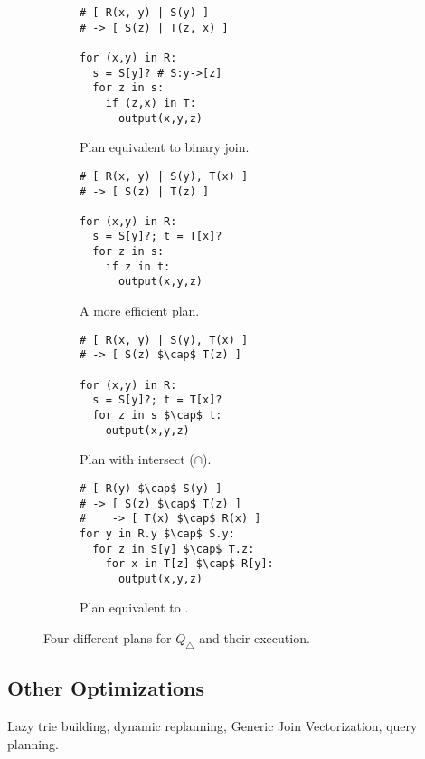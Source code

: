 \begin{figure*}
  \begin{subfigure}[t]{0.23\linewidth}
    \begin{lstlisting}
# [ R(x, y) | S(y) ]
# -> [ S(z) | T(z, x) ]

for (x,y) in R:
  s = S[y]? # S:y->[z]
  for z in s:
    if (z,x) in T:
      output(x,y,z)
\end{lstlisting}
    \caption{Plan equivalent to binary join.}
  \end{subfigure}
  \begin{subfigure}[t]{0.25\linewidth}
    \begin{lstlisting}[numbers=none, showlines=true]
# [ R(x, y) | S(y), T(x) ]
# -> [ S(z) | T(z) ]

for (x,y) in R:
  s = S[y]?; t = T[x]?
  for z in s:
    if z in t:
      output(x,y,z)
\end{lstlisting}
    \caption{A more efficient plan.}
  \end{subfigure}
  \begin{subfigure}[t]{0.25\linewidth}
    \begin{lstlisting}[showlines=true]
# [ R(x, y) | S(y), T(x) ]
# -> [ S(z) $\cap$ T(z) ]

for (x,y) in R:
  s = S[y]?; t = T[x]?
  for z in s $\cap$ t:
    output(x,y,z)

\end{lstlisting}
    \caption{Plan with intersect ($\cap$).}
  \end{subfigure}
  \begin{subfigure}[t]{0.25\linewidth}
    \begin{lstlisting}[showlines=true, numbers=none]
# [ R(y) $\cap$ S(y) ]
# -> [ S(z) $\cap$ T(z) ]
#    -> [ T(x) $\cap$ R(x) ]
for y in R.y $\cap$ S.y:
  for z in S[y] $\cap$ T.z:
    for x in T[z] $\cap$ R[y]:
      output(x,y,z)

\end{lstlisting}
    \caption{Plan equivalent to \GJ.}
  \end{subfigure}
  \caption{Four different \FJ plans for $Q_\triangle$ and their execution.}
\end{figure*}

\subsection{Other Optimizations}\label{sec:other-optimizations}
Lazy trie building, dynamic replanning, Generic Join
Vectorization, query planning.

